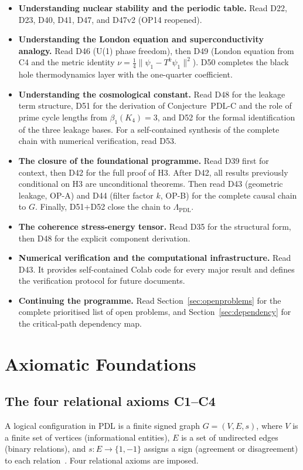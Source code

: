\documentclass[11pt,a4paper]{article}
\theoremstyle{plain}
\theoremstyle{definition}
\theoremstyle{remark}
\begin{document}
\begin{itemize}
\item \textbf{Understanding nuclear stability and the periodic table.} Read D22, D23, D40, D41, D47, and D47v2 (OP14 reopened).
\item \textbf{Understanding the London equation and superconductivity analogy.} Read D46 (U(1) phase freedom), then D49 (London equation from C4 and the metric identity $\nu = \tfrac{1}{4}\|\psi_1 - T^k\psi_1\|^2$). D50 completes the black hole thermodynamics layer with the one-quarter coefficient.
\item \textbf{Understanding the cosmological constant.} Read D48 for the leakage term structure, D51 for the derivation of Conjecture~PDL-C and the role of prime cycle lengths from $\beta_1(K_4)=3$, and D52 for the formal identification of the three leakage bases. For a self-contained synthesis of the complete chain with numerical verification, read D53.
\item \textbf{The closure of the foundational programme.} Read D39 first for context, then D42 for the full proof of H3. After D42, all results previously conditional on H3 are unconditional theorems. Then read D43 (geometric leakage, OP-A) and D44 (filter factor $k$, OP-B) for the complete causal chain to $G$. Finally, D51+D52 close the chain to $\Lambda_{\mathrm{PDL}}$.
\item \textbf{The coherence stress-energy tensor.} Read D35 for the structural form, then D48 for the explicit component derivation.
\item \textbf{Numerical verification and the computational infrastructure.} Read D43. It provides self-contained Colab code for every major result and defines the verification protocol for future documents.
\item \textbf{Continuing the programme.} Read Section~\ref{sec:openproblems} for the complete prioritised list of open problems, and Section~\ref{sec:dependency} for the critical-path dependency map.
\end{itemize}

\section{Axiomatic Foundations}
\label{sec:axioms}

\subsection{The four relational axioms C1--C4}
\label{subsec:axioms}
A logical configuration in PDL is a finite signed graph $G=(V,E,s)$, where $V$ is a finite set of vertices (informational entities), $E$ is a set of undirected edges (binary relations), and $s\colon E\to\{1,-1\}$ assigns a sign (agreement or disagreement) to each relation~\cite{D01,D02}. Four relational axioms are imposed.
\end{document}
